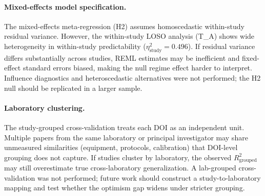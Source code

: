 \paragraph{Mixed-effects model specification.}
The mixed-effects meta-regression (H2) assumes homoscedastic within-study residual
variance. However, the within-study LOSO analysis (T\_A) shows wide heterogeneity in
within-study predictability ($\eta^2_{\text{study}}\!=\!0.496$). If residual variance
differs substantially across studies, REML estimates may be inefficient and fixed-effect
standard errors biased, making the null regime effect harder to interpret. Influence
diagnostics and heteroscedastic alternatives were not performed; the H2 null should be
replicated in a larger sample.

\paragraph{Laboratory clustering.}
The study-grouped cross-validation treats each DOI as an independent unit. Multiple
papers from the same laboratory or principal investigator may share unmeasured
similarities (equipment, protocols, calibration) that DOI-level grouping does not
capture. If studies cluster by laboratory, the observed $R^2_{\text{grouped}}$ may
still overestimate true cross-laboratory generalization. A lab-grouped cross-validation
was not performed; future work should construct a study-to-laboratory mapping and
test whether the optimism gap widens under stricter grouping.
